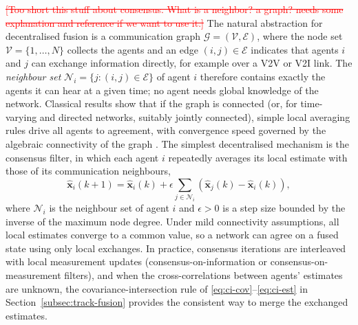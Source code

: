 \documentclass[11pt,oneside,openany]{book}
\newcommand{\deleted}[1]{\textcolor{red}{\sout{#1}}}
\newcommand{\addednew}[1]{\textcolor{RevisionOlive}{#1}}
\begin{document}
\deleted{[Too short this stuff about consensus. What is a neighbor? a graph? needs some explanation and reference if we want to use it.]}
\addednew{The natural abstraction for decentralised fusion is a communication graph $\mathcal{G}=(\mathcal{V},\mathcal{E})$, where the node set $\mathcal{V}=\{1,\dots,N\}$ collects the agents and an edge $(i,j)\in\mathcal{E}$ indicates that agents $i$ and $j$ can exchange information directly, for example over a V2V or V2I link. The \emph{neighbour set} $\mathcal{N}_i=\{j:(i,j)\in\mathcal{E}\}$ of agent $i$ therefore contains exactly the agents it can hear at a given time; no agent needs global knowledge of the network. Classical results show that if the graph is connected (or, for time-varying and directed networks, suitably jointly connected), simple local averaging rules drive all agents to agreement, with convergence speed governed by the algebraic connectivity of the graph \cite{olfatisaber2007_consensus,ren2005_consensus}.}
{\color{blue}
The simplest decentralised mechanism is the consensus filter, in which each agent $i$ repeatedly averages its local estimate with those of its communication neighbours,
\begin{equation}
\widehat{\mathbf{x}}_i(k+1)=\widehat{\mathbf{x}}_i(k)+\epsilon\sum_{j\in\mathcal{N}_i}\left(\widehat{\mathbf{x}}_j(k)-\widehat{\mathbf{x}}_i(k)\right),
\label{eq:consensus-filter}
\end{equation}
where $\mathcal{N}_i$ is the neighbour set of agent $i$ and $\epsilon>0$ is a step size bounded by the inverse of the maximum node degree. Under mild connectivity assumptions, all local estimates converge to a common value, so a network can agree on a fused state using only local exchanges. In practice, consensus iterations are interleaved with local measurement updates (consensus-on-information or consensus-on-measurement filters), and when the cross-correlations between agents' estimates are unknown, the covariance-intersection rule of \eqref{eq:ci-cov}--\eqref{eq:ci-est} in Section~\ref{subsec:track-fusion} provides the consistent way to merge the exchanged estimates.
}
\end{document}
